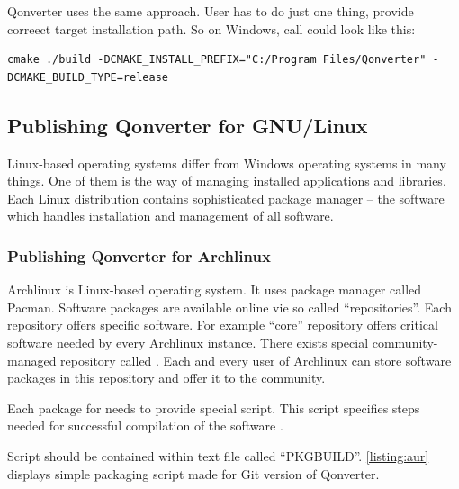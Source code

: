 Qonverter uses the same approach. User has to do just one thing, provide correect target installation path. So on Windows, call could look like this:
\begin{lstlisting}[language=text,numbers=none]
cmake ./build -DCMAKE_INSTALL_PREFIX="C:/Program Files/Qonverter" -DCMAKE_BUILD_TYPE=release
\end{lstlisting}

\subsection{Publishing Qonverter for GNU/Linux}
Linux-based operating systems differ from Windows operating systems in many things. One of them is the way of managing installed applications and libraries. Each Linux distribution contains sophisticated package manager -- the software which handles installation and management of all software.

\subsubsection{Publishing Qonverter for Archlinux}
Archlinux is Linux-based operating system. It uses package manager called Pacman. Software packages are available online vie so called \enquote{repositories}. Each repository offers specific software. For example \enquote{core} repository offers critical software needed by every Archlinux instance. There exists special community-managed repository called . Each and every user of Archlinux can store software packages in this repository and offer it to the community.

Each package for  needs to provide special script. This script specifies steps needed for successful compilation of the software \citep{arch:aur}.

Script should be contained within text file called \enquote{PKGBUILD}. \autoref{listing:aur} displays simple packaging script made for Git version of Qonverter.

